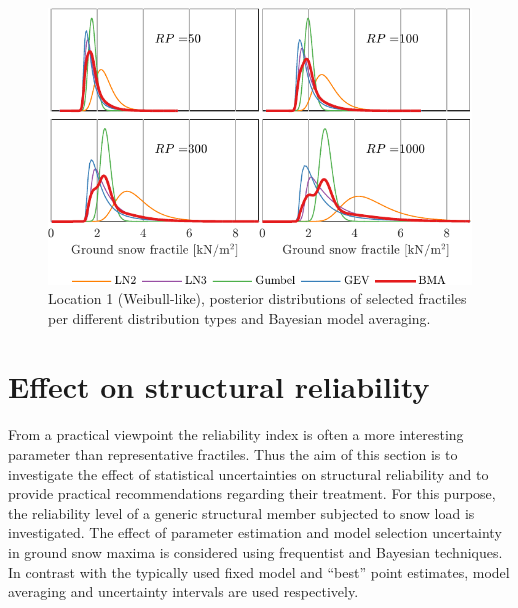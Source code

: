 \begin{figure}[htbp!]
	\centering    
	\includegraphics[]{posterior_BMA_2x2_ID300.pdf}
	\caption{Location 1 (Weibull-like), posterior distributions of selected fractiles per different distribution types and Bayesian model averaging.}
	\label{fig:loc1_posterior_bma_2x2}
\end{figure}


\section{Effect on structural reliability}
From a practical viewpoint the reliability index is often a more interesting parameter than representative fractiles. Thus the aim of this section is to investigate the effect of statistical uncertainties on structural reliability and to provide practical recommendations regarding their treatment. For this purpose, the reliability level of a generic structural member subjected to snow load is investigated. The effect of parameter estimation and model selection uncertainty in ground snow maxima is considered using frequentist and Bayesian techniques. In contrast with the typically used fixed model and ``best'' point estimates, model averaging and uncertainty intervals are used respectively.

